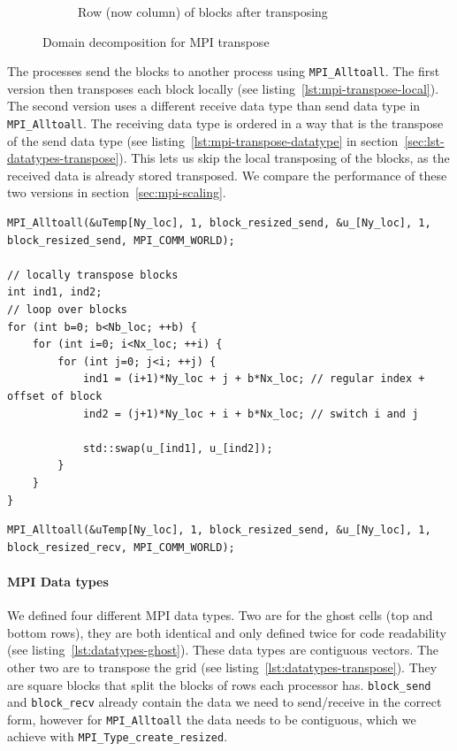 \documentclass[a4paper]{article}
\begin{document}
{\begin{figure}
\begin{subfigure}{0.45\textwidth}
		\caption{Row (now column) of blocks after transposing}
		\label{fig:domain-decomp-block-after}
	\end{subfigure}
	\caption{Domain decomposition for MPI transpose\protect\footnotemark}
	\label{fig:domain-decomp-block}
\end{figure}
}
The processes send the blocks to another process using \verb+MPI_Alltoall+.
The first version then transposes each block locally (see listing~\ref{lst:mpi-transpose-local}).
The second version uses a different receive data type than send data type in \verb+MPI_Alltoall+.
The receiving data type is ordered in a way that is the transpose of the send data type (see listing~\ref{lst:mpi-transpose-datatype} in section~\ref{sec:lst-datatypes-transpose}).
This lets us skip the local transposing of the blocks, as the received data is already stored transposed.
We compare the performance of these two versions in section~\ref{sec:mpi-scaling}.

\begin{lstlisting}[label={lst:mpi-transpose-local}, caption={Transposing the grid using MPI Alltoall and local transpose}, float]
MPI_Alltoall(&uTemp[Ny_loc], 1, block_resized_send, &u_[Ny_loc], 1, block_resized_send, MPI_COMM_WORLD);
        
// locally transpose blocks
int ind1, ind2;
// loop over blocks
for (int b=0; b<Nb_loc; ++b) {
    for (int i=0; i<Nx_loc; ++i) {
        for (int j=0; j<i; ++j) {
            ind1 = (i+1)*Ny_loc + j + b*Nx_loc; // regular index + offset of block
            ind2 = (j+1)*Ny_loc + i + b*Nx_loc; // switch i and j
                    
            std::swap(u_[ind1], u_[ind2]);
        }
    }
}
\end{lstlisting}
\begin{lstlisting}[label={lst:mpi-transpose-datatype}, caption={Transposing the grid using MPI Alltoall and different send/receive datatypes}, float]
MPI_Alltoall(&uTemp[Ny_loc], 1, block_resized_send, &u_[Ny_loc], 1, block_resized_recv, MPI_COMM_WORLD);
\end{lstlisting}


\paragraph{MPI Data types}
We defined four different MPI data types.
Two are for the ghost cells (top and bottom rows), they are both identical and only defined twice for code readability (see listing~\ref{lst:datatypes-ghost}).
These data types are contiguous vectors.
The other two are to transpose the grid (see listing~\ref{lst:datatypes-transpose}).
They are square blocks that split the blocks of rows each processor has.
\verb+block_send+ and \verb+block_recv+ already contain the data we need to send/receive in the correct form, however for \verb+MPI_Alltoall+ the data needs to be contiguous, which we achieve with \verb+MPI_Type_create_resized+.
\end{document}
